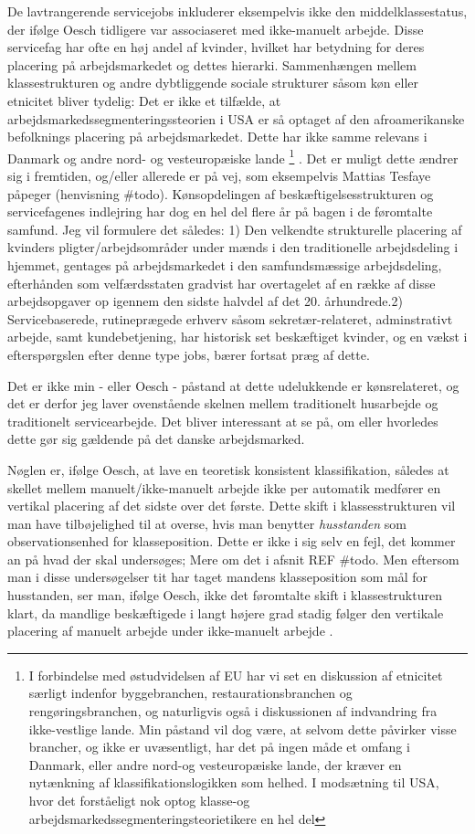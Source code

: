 De lavtrangerende servicejobs inkluderer eksempelvis ikke den middelklassestatus, der ifølge Oesch tidligere var associaseret med ikke-manuelt arbejde. Disse servicefag har ofte en høj andel af kvinder, hvilket har betydning for deres placering på arbejdsmarkedet og dettes hierarki.   Sammenhængen mellem klassestrukturen og andre dybtliggende sociale strukturer såsom køn eller etnicitet bliver tydelig: Det er ikke et tilfælde, at arbejdsmarkedssegmenteringssteorien i USA er så optaget af den afroamerikanske befolknings placering på arbejdsmarkedet. Dette har ikke samme relevans i Danmark og andre nord- og vesteuropæiske lande%
%
\footnote{  I forbindelse med østudvidelsen af EU har vi set en diskussion af etnicitet særligt indenfor byggebranchen, restaurationsbranchen og rengøringsbranchen, og naturligvis også i diskussionen af indvandring fra ikke-vestlige lande. Min påstand vil dog være, at selvom dette påvirker visse brancher, og ikke er uvæsentligt, har det på ingen måde et omfang i Danmark, eller andre nord-og vesteuropæiske lande, der kræver en nytænkning af klassifikationslogikken som helhed. I modsætning til USA, hvor det forståeligt nok optog klasse-og arbejdsmarkedssegmenteringsteorietikere en hel del}%
%
. Det er muligt dette ændrer sig i fremtiden, og/eller allerede er på vej, som eksempelvis Mattias Tesfaye påpeger (henvisning \#todo). Kønsopdelingen af beskæftigelsesstrukturen og servicefagenes indlejring har dog en hel del flere år på bagen i de føromtalte samfund. Jeg vil formulere det således:
1) Den velkendte strukturelle placering af kvinders pligter/arbejdsområder under mænds i den traditionelle arbejdsdeling i hjemmet, gentages på arbejdsmarkedet i den samfundsmæssige arbejdsdeling, efterhånden som velfærdsstaten gradvist har overtagelet af en række af disse arbejdsopgaver op igennem den sidste halvdel af det 20. århundrede.2) Servicebaserede, rutineprægede erhverv såsom sekretær-relateret, adminstrativt arbejde, samt kundebetjening, har historisk set beskæftiget kvinder, og en vækst i efterspørgslen efter denne type jobs, bærer fortsat præg af dette. 

Det er ikke min - eller Oesch - påstand at dette udelukkende er kønsrelateret, og det er derfor jeg laver ovenstående skelnen mellem  traditionelt husarbejde og traditionelt servicearbejde. Det bliver interessant at se på, om eller hvorledes dette gør sig gældende på det danske arbejdsmarked. 

Nøglen er, ifølge Oesch, at lave en teoretisk konsistent klassifikation, således at skellet mellem manuelt/ikke-manuelt arbejde ikke per automatik medfører en vertikal placering af det sidste over det første. Dette skift i klassesstrukturen vil man have tilbøjelighed til at overse, hvis man benytter \emph{husstanden} som observationsenhed for klasseposition. Dette er ikke i sig selv en fejl, det kommer an på hvad der skal undersøges; Mere om det i afsnit REF \#todo. Men eftersom man i disse undersøgelser tit har taget mandens klasseposition som mål for husstanden, ser man, ifølge Oesch, ikke det føromtalte skift i klassestrukturen klart, da mandlige beskæftigede i langt højere grad stadig følger den vertikale placering af manuelt arbejde under ikke-manuelt arbejde \parencite[42]{Oesch2006a}.

